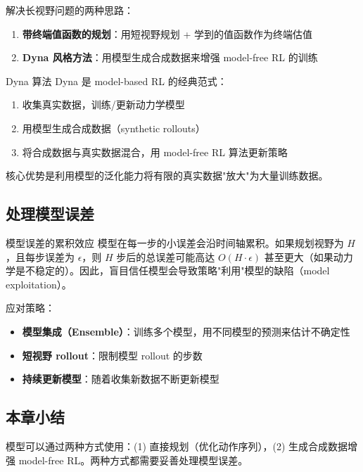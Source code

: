 \documentclass[a4paper]{article}
\begin{document}
解决长视野问题的两种思路：
\begin{enumerate}
    \item \textbf{带终端值函数的规划}：用短视野规划 + 学到的值函数作为终端估值
    \item \textbf{Dyna 风格方法}：用模型生成合成数据来增强 model-free RL 的训练
\end{enumerate}

\begin{importantbox}{Dyna 算法}
Dyna 是 model-based RL 的经典范式：
\begin{enumerate}
    \item 收集真实数据，训练/更新动力学模型
    \item 用模型生成合成数据（synthetic rollouts）
    \item 将合成数据与真实数据混合，用 model-free RL 算法更新策略
\end{enumerate}
核心优势是利用模型的泛化能力将有限的真实数据"放大"为大量训练数据。
\end{importantbox}

\subsection{处理模型误差}

\begin{warningbox}{模型误差的累积效应}
模型在每一步的小误差会沿时间轴累积。如果规划视野为 $H$，且每步误差为 $\epsilon$，则 $H$ 步后的总误差可能高达 $O(H \cdot \epsilon)$ 甚至更大（如果动力学是不稳定的）。因此，盲目信任模型会导致策略"利用"模型的缺陷（model exploitation）。
\end{warningbox}

应对策略：
\begin{itemize}
    \item \textbf{模型集成（Ensemble）}：训练多个模型，用不同模型的预测来估计不确定性
    \item \textbf{短视野 rollout}：限制模型 rollout 的步数
    \item \textbf{持续更新模型}：随着收集新数据不断更新模型
\end{itemize}

\subsection{本章小结}

模型可以通过两种方式使用：(1) 直接规划（优化动作序列），(2) 生成合成数据增强 model-free RL。两种方式都需要妥善处理模型误差。
\end{document}
